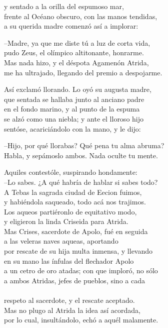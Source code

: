 y sentado a la orilla del espumoso mar,\\
frente al Océano obscuro, con las manos tendidas,\\
a su querida madre comenzó así a implorar:\par
--Madre, ya que me diste tú a luz de corta vida,\\
pudo Zeus, el olímpico altitonante, honrarme.\\
Mas nada hizo, y el déspota Agamenón Atrida,\\
me ha ultrajado, llegando del premio a despojarme.\par
Así exclamó llorando. Lo oyó su augusta madre,\\
que sentada se hallaba junto al anciano padre\\
en el fondo marino, y al punto de la espuma\\
se alzó como una niebla; y ante el lloroso hijo\\
sentóse, acariciándolo con la mano, y le dijo:\par
--Hijo, por qué llorabas? Qué pena tu alma abruma?\\
Habla, y sepámoslo ambos. Nada oculte tu mente.\par
Aquiles contestóle, suspirando hondamente:\\
--Lo sabes. ¿A qué habría de hablar si sabes todo?\\
A Tebas la sagrada ciudad de Eecion fuimos,\\
y habiéndola saqueado, todo acá nos trajimos.\\
Los aqueos partiéronlo de equitativo modo,\\
y eligieron la linda Criseida para Atrida.\\
Mas Crises, sacerdote de Apolo, fué en seguida\\
a las veleras naves aqueas, aportando\\
por rescate de su hija multa inmensa, y llevando\\
en su mano las ínfulas del flechador Apolo\\
a un cetro de oro atadas; con que imploró, no sólo\\
a ambos Atridas, jefes de pueblos, sino a cada\\
\\
respeto al sacerdote, y el rescate aceptado.\\
Mas no plugo al Atrida la idea así acordada,\\
por lo cual, insultándolo, echó a aquél malamente.\\
